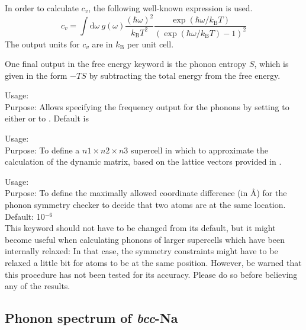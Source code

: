 In order to calculate $c_v$, the following well-known expression is
used. 
\begin{equation}
c_v = \int \mathrm{d}\omega\ g(\omega) \frac{(\hbar\omega)^2}{k_\mathrm{B}T^2}\frac{\exp(\hbar\omega/k_\mathrm{B}T)}{(\exp(\hbar\omega/k_\mathrm{B}T)-1)^2}
\label{cv_expression}
\end{equation}
 The output units for $c_v$ are in $k_\mathrm{B}$ per unit cell.

One final output in the free energy keyword is the phonon entropy $S$,
which is given in the form $-TS$ by subtracting the total energy from
the free energy. 

{ Usage:   \\[1.0em]
  Purpose: Allows specifying the frequency output for the phonons by
  setting  to either  or to
  . Default is  \\}

{ Usage:   
   
  \\[1.0em]
  Purpose: To define a $n1\times n2\times n3$ supercell in which to
  approximate the calculation of the dynamic matrix, based on the
  lattice vectors provided in . }

{Usage:  
   \\[1.0em]
Purpose: To define the maximally allowed coordinate difference (in
\AA) for the phonon symmetry checker to decide that two atoms are at
the same location. Default: 10$^{-6}$\\}
This keyword should not have to be changed from its default, but it
might become useful when calculating phonons of larger supercells
which have been internally relaxed: In that case, the symmetry
constraints might have to be relaxed a little bit for atoms to be at
the same position. However, be warned that this procedure has not been
tested for its accuracy. Please do so before believing any of the
results. 

\subsection*{Phonon spectrum of \emph{bcc}-Na}

